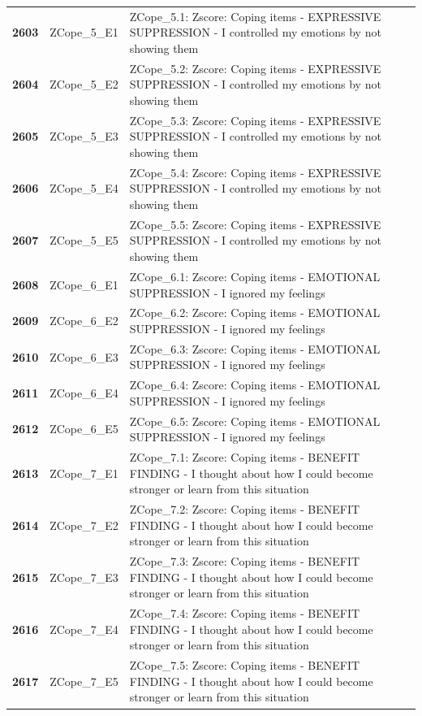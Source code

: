 \documentclass[
  letterpaper,
  DIV=11,
  numbers=noendperiod]{scrartcl}
\begin{document}
\begin{longtable}[t]{>{}cll}
\textbf{2603} & ZCope\_5\_E1 & ZCope\_5.1: Zscore:  Coping items - EXPRESSIVE SUPPRESSION - I controlled my emotions by not showing them\\
\textbf{2604} & ZCope\_5\_E2 & ZCope\_5.2: Zscore:  Coping items - EXPRESSIVE SUPPRESSION - I controlled my emotions by not showing them\\
\textbf{2605} & ZCope\_5\_E3 & ZCope\_5.3: Zscore:  Coping items - EXPRESSIVE SUPPRESSION - I controlled my emotions by not showing them\\
\addlinespace
\textbf{2606} & ZCope\_5\_E4 & ZCope\_5.4: Zscore:  Coping items - EXPRESSIVE SUPPRESSION - I controlled my emotions by not showing them\\
\textbf{2607} & ZCope\_5\_E5 & ZCope\_5.5: Zscore:  Coping items - EXPRESSIVE SUPPRESSION - I controlled my emotions by not showing them\\
\textbf{2608} & ZCope\_6\_E1 & ZCope\_6.1: Zscore:  Coping items - EMOTIONAL SUPPRESSION - I ignored my feelings\\
\textbf{2609} & ZCope\_6\_E2 & ZCope\_6.2: Zscore:  Coping items - EMOTIONAL SUPPRESSION - I ignored my feelings\\
\textbf{2610} & ZCope\_6\_E3 & ZCope\_6.3: Zscore:  Coping items - EMOTIONAL SUPPRESSION - I ignored my feelings\\
\addlinespace
\textbf{2611} & ZCope\_6\_E4 & ZCope\_6.4: Zscore:  Coping items - EMOTIONAL SUPPRESSION - I ignored my feelings\\
\textbf{2612} & ZCope\_6\_E5 & ZCope\_6.5: Zscore:  Coping items - EMOTIONAL SUPPRESSION - I ignored my feelings\\
\textbf{2613} & ZCope\_7\_E1 & ZCope\_7.1: Zscore:  Coping items - BENEFIT FINDING - I thought about how I could become stronger or learn from this situation\\
\textbf{2614} & ZCope\_7\_E2 & ZCope\_7.2: Zscore:  Coping items - BENEFIT FINDING - I thought about how I could become stronger or learn from this situation\\
\textbf{2615} & ZCope\_7\_E3 & ZCope\_7.3: Zscore:  Coping items - BENEFIT FINDING - I thought about how I could become stronger or learn from this situation\\
\addlinespace
\textbf{2616} & ZCope\_7\_E4 & ZCope\_7.4: Zscore:  Coping items - BENEFIT FINDING - I thought about how I could become stronger or learn from this situation\\
\textbf{2617} & ZCope\_7\_E5 & ZCope\_7.5: Zscore:  Coping items - BENEFIT FINDING - I thought about how I could become stronger or learn from this situation\\

\end{longtable}
\end{document}
